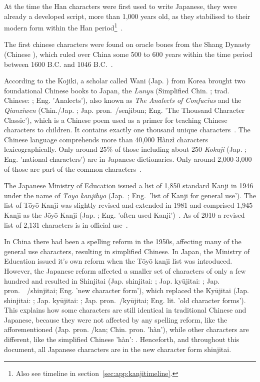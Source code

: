 At the time the Han characters were first used to write Japanese, 
they were already a developed script, more than 1,000 years old, 
as they stabilised to their modern form within the Han 
period\footnote{Also see timeline in section~\ref{sec:app:kanjitimeline}.}~.

The first chinese characters were found on oracle bones from the Shang Dynasty
(Chinese ), which ruled over China some 500 to 600 years within the 
time period between 1600 B.C. and 1046 B.C.~.

According to the Kojiki, a scholar called Wani (Jap. ) from Korea 
brought two foundational Chinese books to Japan, the \emph{Lunyu} 
(Simplified Chin. ; trad. Chinese: ; Eng. 'Analects'), 
also known as \emph{The Analects of Confucius} and 
the \emph{Qianziwen} (Chin./Jap. ; Jap. 
pron.~/senjibun; Eng. 'The Thousand Character Classic'),
which is a Chinese poem used as a primer for teaching Chinese characters to 
children. It contains exactly one thousand unique 
characters~. The Chinese language comprehends more 
than 40,000 Hànzì characters lexicographically. Only around 25\% of those 
including about 250 \emph{Kokuji} (Jap. ; Eng. 'national characters') 
are in Japanese dictionaries. Only around 2,000-3,000 of those are part of the 
common characters~. 

The Japanese Ministry of Education issued a list of 1,850 standard Kanji in 1946
under the name of \emph{Tōyō kanjihyō} (Jap.~;
Eng.~'list of Kanji for general use'). The list of Tōyō Kanji was slightly 
revised and extended in 1981 and comprised 1,945 Kanji as the Jōyō Kanji
(Jap. ; Eng. 'often used Kanji')~.
As of 2010 a revised list of 2,131 characters is in official 
use~. 

In China there had been a spelling reform in the 1950s, affecting many of the
general use characters, resulting in simplified Chinese. In Japan, the Ministry
of Education issued it's own reform when the Tōyō kanji list was introduced.
However, the Japanese reform affected a smaller set of characters of only a few 
hundred and resulted in Shinjitai (Jap. shinjitai: ; 
Jap. kyūjitai: ;
Jap. pron.　/shinjitai; Eng. 'new character form'), 
which replaced the Kyūjitai 
(Jap. shinjitai: ; Jap. kyūjitai: ; 
Jap. pron.~/kyūjitai; Eng. lit. 'old character forms'). 
This explains how some characters are still identical in traditional Chinese and 
Japanese, because they were not affected by any spelling reform, like the 
afforementioned  (Jap. pron. /kan; Chin. pron. 'hàn'),
while other characters are different, like the simplified 
Chinese 'hàn': . Henceforth, and throughout this document, all Japanese characters are in the new character form shinjitai.

